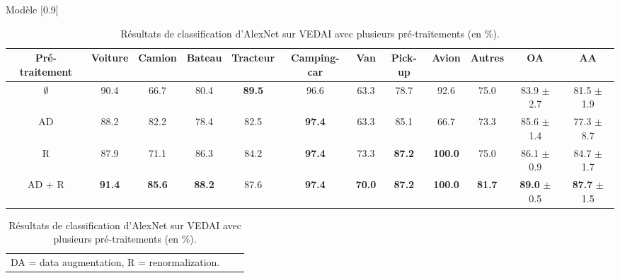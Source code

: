\begin{table}[t]
\centering
	\caption{Résultats de classification d'AlexNet sur \gls{VEDAI} avec plusieurs pré-traitements (en \%).}
    \label{table:da_benchmark}Modèle
   \scalebox{0.9}[0.9]{
	\begin{tabular}{cccccccccccc}
    \toprule
    \textbf{Pré-traitement} &  \textbf{Voiture} & \textbf{Camion} & \textbf{Bateau} & \textbf{Tracteur} & \textbf{Camping-car} & \textbf{Van} & \textbf{Pick-up} & \textbf{Avion} & \textbf{Autres} & \textbf{OA} & \textbf{AA}\\
    \midrule
    $\emptyset$ & 90.4 & 66.7 & 80.4 & \textbf{89.5} & 96.6 & 63.3 & 78.7 & 92.6 & 75.0 & 83.9 \footnotesize $\pm$ 2.7 & 81.5 \footnotesize $\pm$ 1.9\\
    AD & 88.2 & 82.2 & 78.4 & 82.5 & \textbf{97.4} & 63.3 & 85.1 & 66.7 & 73.3 & 85.6 \footnotesize $\pm$ 1.4 & 77.3 \footnotesize $\pm$ 8.7\\
    R & 87.9 & 71.1 & 86.3 & 84.2 & \textbf{97.4} & 73.3 & \textbf{87.2} & \textbf{100.0} & 75.0 & 86.1 \footnotesize $\pm$ 0.9 & 84.7 \footnotesize $\pm$ 1.7\\
    AD + R & \textbf{91.4} & \textbf{85.6} & \textbf{88.2} & 87.6 & \textbf{97.4} & \textbf{70.0} & \textbf{87.2} & \textbf{100.0} & \textbf{81.7} & \textbf{89.0} \footnotesize $\pm$ 0.5 & \textbf{87.7} \footnotesize $\pm$ 1.5\\
    \bottomrule
    \end{tabular}}
    \begin{tabular}{ccc}
\multicolumn{1}{c}{\footnotesize  DA = data augmentation, R = renormalization.}
\end{tabular}
\end{table}

